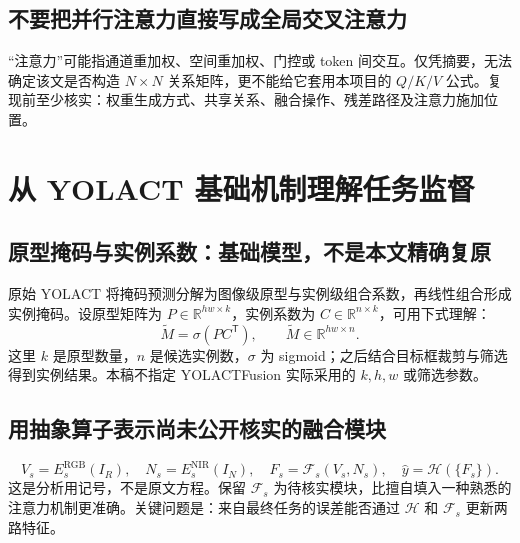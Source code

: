 \documentclass[UTF8,a4paper,11pt,fontset=windows]{ctexart}
\newcommand{\newpagepart}{\clearpage}
\begin{document}
\subsection{不要把并行注意力直接写成全局交叉注意力}
“注意力”可能指通道重加权、空间重加权、门控或 token 间交互。仅凭摘要，无法确定该文是否构造 $N\times N$ 关系矩阵，更不能给它套用本项目的 $Q/K/V$ 公式。复现前至少核实：权重生成方式、共享关系、融合操作、残差路径及注意力施加位置。

\newpagepart
\section{从 YOLACT 基础机制理解任务监督}
\subsection{原型掩码与实例系数：基础模型，不是本文精确复原}
原始 YOLACT 将掩码预测分解为图像级原型与实例级组合系数，再线性组合形成实例掩码\cite{bolya2019}。设原型矩阵为 $P\in\mathbb{R}^{hw\times k}$，实例系数为 $C\in\mathbb{R}^{n\times k}$，可用下式理解：
\begin{equation}
  \widetilde M=\sigma(PC^{\mathsf T}),\qquad
  \widetilde M\in\mathbb{R}^{hw\times n}.
\end{equation}
这里 $k$ 是原型数量，$n$ 是候选实例数，$\sigma$ 为 sigmoid；之后结合目标框裁剪与筛选得到实例结果。本稿不指定 YOLACTFusion 实际采用的 $k,h,w$ 或筛选参数。

\begin{center}
\end{center}

\subsection{用抽象算子表示尚未公开核实的融合模块}
\begin{equation}
  V_s=E_s^{\mathrm{RGB}}(I_R),\quad
  N_s=E_s^{\mathrm{NIR}}(I_N),\quad
  F_s=\mathcal F_s(V_s,N_s),\quad
  \widehat y=\mathcal H(\{F_s\}).
\end{equation}
这是分析用记号，不是原文方程。保留 $\mathcal F_s$ 为待核实模块，比擅自填入一种熟悉的注意力机制更准确。关键问题是：来自最终任务的误差能否通过 $\mathcal H$ 和 $\mathcal F_s$ 更新两路特征。
\end{document}
